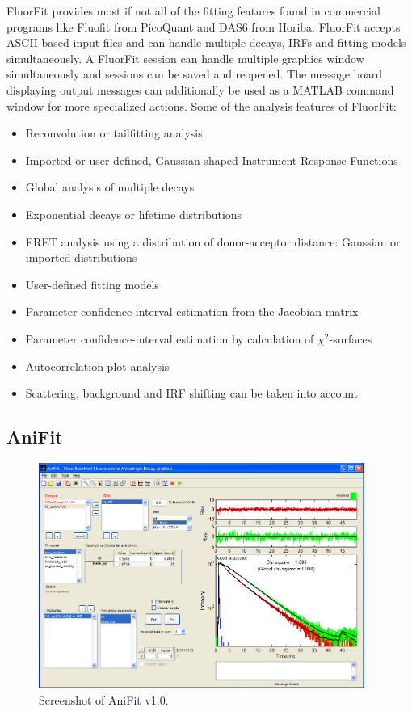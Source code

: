  FluorFit provides most if not all of the fitting features found in commercial programs like Fluofit from PicoQuant and DAS6 from Horiba. FluorFit accepts ASCII-based input files and can handle multiple decays, IRFs and fitting models simultaneously. A FluorFit session can handle multiple graphics window simultaneously and sessions can be saved and reopened. The message board displaying output messages can additionally be used as a MATLAB command window for more specialized actions. Some of the analysis features of FluorFit:
\begin{itemize}
  \item Reconvolution or tailfitting analysis
  \item Imported or user-defined, Gaussian-shaped Instrument Response Functions
  \item Global analysis of multiple decays
  \item Exponential decays or lifetime distributions
  \item FRET analysis using a distribution of donor-acceptor distance: Gaussian or imported distributions
  \item User-defined fitting models
  \item Parameter confidence-interval estimation from the Jacobian matrix
  \item Parameter confidence-interval estimation by calculation of $\chi^2$-surfaces
  \item Autocorrelation plot analysis
  \item Scattering, background and IRF shifting can be taken into account
\end{itemize}

\subsection{AniFit}
\begin{figure}
    \centering
        \includegraphics[width=0.95\textwidth]{adds//anifit_fig.png}
    \captionsetup{width=.95\textwidth}
    \caption{Screenshot of AniFit v1.0.}
    \label{Fig:chap_Papers_anifit}
\end{figure}

